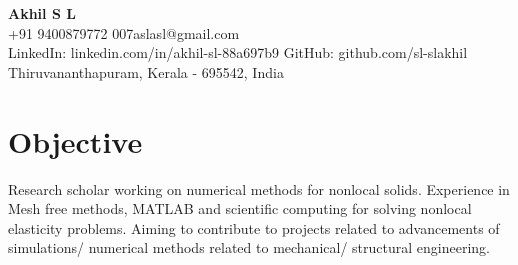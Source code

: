 \documentclass[a4paper,11pt]{article}
\newcommand{\socialicon}[1]{\raisebox{-0.05em}{\resizebox{!}{1em}{#1}}}
\newcommand{\headerfontiii}{\fontfamily{ppl}\selectfont} %
\begin{document}
	\headerfontiii
	\textbf{\Large{Akhil S L}} \\
	+91 9400879772 \quad \textbar\quad 007aslasl@gmail.com \\
	LinkedIn: linkedin.com/in/akhil-sl-88a697b9 \quad GitHub: github.com/sl-slakhil \\
	Thiruvananthapuram, Kerala - 695542, India
	
%	
%	
%	
	\vspace{2mm}
	
	\section{\textbf{Objective}}
	\vspace{1mm}
	\small{
		Research scholar working on numerical methods for nonlocal solids. Experience in Mesh free methods, MATLAB and scientific computing for solving nonlocal elasticity problems. Aiming to contribute to projects related to advancements of simulations/ numerical methods related to mechanical/ structural engineering.
	}
	\vspace{-2mm}
	
	
	
\end{document}
